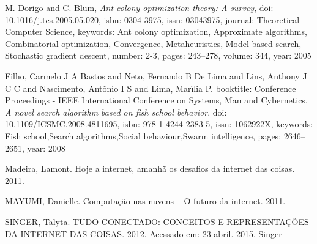 \documentclass[conference,compsoc]{IEEEtran}
\begin{document}
\begin{thebibliography}{1}
M. Dorigo and C. Blum,
\emph{Ant colony optimization theory: A survey},
doi: {10.1016/j.tcs.2005.05.020},
isbn: {0304-3975},
issn: {03043975},
journal: {Theoretical Computer Science},
keywords: {Ant colony optimization, Approximate algorithms, Combinatorial optimization, Convergence, Metaheuristics, Model-based search, Stochastic gradient descent},
number: {2-3},
pages: {243--278},
volume: {344},
year: {2005}


Filho, Carmelo J A Bastos and Neto, Fernando B De Lima and Lins, Anthony J C C and Nascimento, Ant\^{o}nio I S and Lima, Mar\'{\i}lia P.
booktitle: {Conference Proceedings - IEEE International Conference on Systems, Man and Cybernetics},
\emph{A novel search algorithm based on fish school behavior},
doi: {10.1109/ICSMC.2008.4811695},
isbn: {978-1-4244-2383-5},
issn: {1062922X},
keywords: {Fish school,Search algorithms,Social behaviour,Swarm intelligence},
pages: {2646--2651},
year: {2008}


Madeira, Lamont. Hoje a internet, amanhã os desafios da internet das coisas. 2011.

MAYUMI, Danielle. Computação nas nuvens – O futuro da internet. 2011.


SINGER, Talyta. TUDO CONECTADO: CONCEITOS E REPRESENTAÇÕES DA INTERNET DAS COISAS. 2012.
Acessado em: 23 abril. 2015.
\href{http://www.simsocial2012.ufba.br/modulos/submissao/Upload/44965.pdf} {Singer}


\end{thebibliography}






\end{document}
